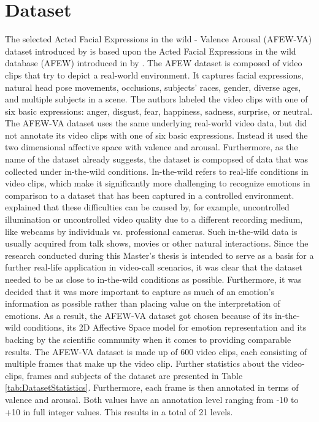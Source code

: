 \section{Dataset}
The selected Acted Facial Expressions in the wild - Valence Arousal (AFEW-VA) dataset introduced by \citet{Kossaifi:2017:AFEW-VADatabase} is based upon the Acted Facial Expressions in the wild database (AFEW) introduced in \citeyear{Dhall:2012:AFEW} by \citet{Dhall:2012:AFEW}. The AFEW dataset is composed of video clips that try to depict a real-world environment. It captures facial expressions, natural head pose movements, occlusions, subjects' races, gender, diverse ages, and multiple subjects in a scene. The authors labeled the video clips with one of six basic expressions: anger, disgust, fear, happiness, sadness, surprise, or neutral. The AFEW-VA dataset \citep{Kossaifi:2017:AFEW-VADatabase} uses the same underlying real-world video data, but did not annotate its video clips with one of six basic expressions. Instead it used the two dimensional affective space with valence and arousal. 
\newline\newline
Furthermore, as the name of the dataset already suggests, the dataset is compopsed of data that was collected under in-the-wild conditions. In-the-wild refers to real-life conditions in video clips, which make it significantly more challenging to recognize emotions in comparison to a dataset that has been captured in a controlled environment. \citet{Salah:2018:VideoBasedER} explained that these difficulties can be caused by, for example, uncontrolled illumination or uncontrolled video quality due to a different recording medium, like webcams by individuals vs. professional cameras. Such in-the-wild data is usually acquired from talk shows, movies or other natural interactions. 
\newline\newline
Since the research conducted during this Master's thesis is intended to serve as a basis for a further real-life application in video-call scenarios, it was clear that the dataset needed to be as close to in-the-wild conditions as possible. Furthermore, it was decided that it was more important to capture as much of an emotion's information as possible rather than placing value on the interpretation of emotions. As a result, the AFEW-VA dataset got chosen because of its in-the-wild conditions, its 2D Affective Space model for emotion representation and its backing by the scientific community when it comes to providing comparable results.
\newline\newline
The AFEW-VA dataset is made up of 600 video clips, each consisting of multiple frames that make up the video clip. Further statistics about the video-clips, frames and subjects of the dataset are presented in Table \ref{tab:DatasetStatistics}. Furthermore, each frame is then annotated in terms of valence and arousal. Both values have an annotation level ranging from -10 to +10 in full integer values. This results in a total of 21 levels.\citep{Kossaifi:2017:AFEW-VADatabase} 

